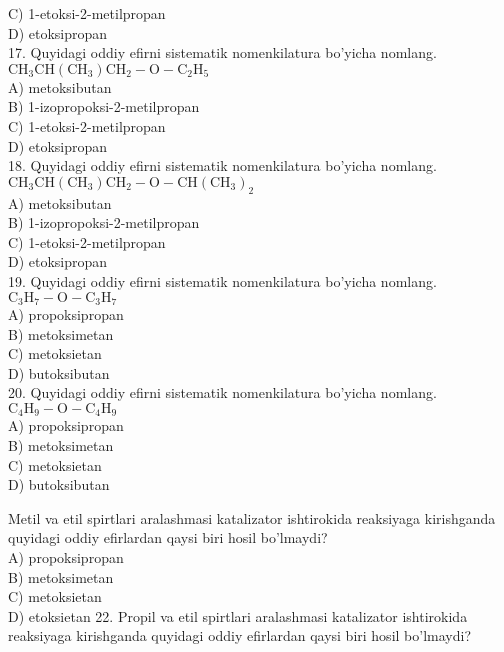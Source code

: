 C) 1-etoksi-2-metilpropan\\
D) etoksipropan\\
17. Quyidagi oddiy efirni sistematik nomenkilatura bo'yicha nomlang.\\
$\mathrm{CH}_{3} \mathrm{CH}\left(\mathrm{CH}_{3}\right) \mathrm{CH}_{2}-\mathrm{O}-\mathrm{C}_{2} \mathrm{H}_{5}$\\
A) metoksibutan\\
B) 1-izopropoksi-2-metilpropan\\
C) 1-etoksi-2-metilpropan\\
D) etoksipropan\\
18. Quyidagi oddiy efirni sistematik nomenkilatura bo'yicha nomlang.\\
$\mathrm{CH}_{3} \mathrm{CH}\left(\mathrm{CH}_{3}\right) \mathrm{CH}_{2}-\mathrm{O}-\mathrm{CH}\left(\mathrm{CH}_{3}\right)_{2}$\\
A) metoksibutan\\
B) 1-izopropoksi-2-metilpropan\\
C) 1-etoksi-2-metilpropan\\
D) etoksipropan\\
19. Quyidagi oddiy efirni sistematik nomenkilatura bo'yicha nomlang.\\
$\mathrm{C}_{3} \mathrm{H}_{7}-\mathrm{O}-\mathrm{C}_{3} \mathrm{H}_{7}$\\
A) propoksipropan\\
B) metoksimetan\\
C) metoksietan\\
D) butoksibutan\\
20. Quyidagi oddiy efirni sistematik nomenkilatura bo'yicha nomlang. $\mathrm{C}_{4} \mathrm{H}_{9}-\mathrm{O}-\mathrm{C}_{4} \mathrm{H}_{9}$\\
A) propoksipropan\\
B) metoksimetan\\
C) metoksietan\\
D) butoksibutan
  \item Metil va etil spirtlari aralashmasi katalizator ishtirokida reaksiyaga kirishganda quyidagi oddiy efirlardan qaysi biri hosil bo'lmaydi?\\
A) propoksipropan\\
B) metoksimetan\\
C) metoksietan\\
D) etoksietan
22. Propil va etil spirtlari aralashmasi katalizator ishtirokida reaksiyaga kirishganda quyidagi oddiy efirlardan qaysi biri hosil bo'lmaydi?\\
